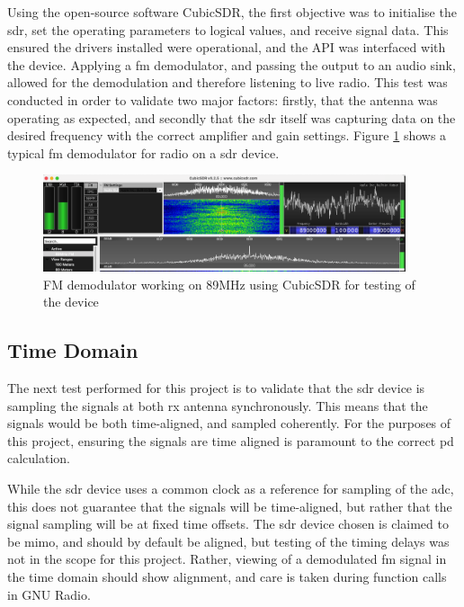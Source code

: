 \documentclass[class=report,11pt,crop=false]{standalone}
\begin{document}
Using the open-source software CubicSDR, the first objective was to initialise the \gls{sdr}, set the operating parameters to logical values, and receive signal data. This ensured the drivers installed were operational, and the \gls{API} was interfaced with the device. Applying a \gls{fm} demodulator, and passing the output to an audio sink, allowed for the demodulation and therefore listening to live radio. This test was conducted in order to validate two major factors: firstly, that the antenna was operating as expected, and secondly that the \gls{sdr} itself was capturing data on the desired frequency with the correct amplifier and gain settings. Figure \ref{fig:cubic-demod} shows a typical \gls{fm} demodulator for radio on a \gls{sdr} device. 

\begin{figure}[h!]
    \centering
    \includegraphics[width=0.95\textwidth]{Images/diagrams/fm_demod_cubicSDR.png}
    \caption{FM demodulator working on 89MHz using CubicSDR for testing of the device}
    \label{fig:cubic-demod}
\end{figure}

\subsection{Time Domain}
The next test performed for this project is to validate that the \gls{sdr} device is sampling the signals at both \gls{rx} antenna synchronously. This means that the signals would be both time-aligned, and sampled coherently. For the purposes of this project, ensuring the signals are time aligned is paramount to the correct \gls{pd} calculation. 

While the \gls{sdr} device uses a common clock as a reference for sampling of the \gls{adc}, this does not guarantee that the signals will be time-aligned, but rather that the signal sampling will be at fixed time offsets. The \gls{sdr} device chosen is claimed to be \gls{mimo}, and should by default be aligned, but testing of the timing delays was not in the scope for this project. Rather, viewing of a demodulated \gls{fm} signal in the time domain should show alignment, and care is taken during function calls in GNU Radio. 
\end{document}
